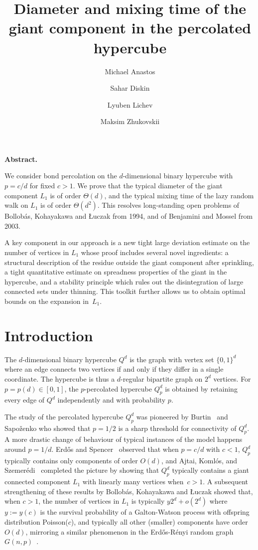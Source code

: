 \documentclass[reqno,final,a4paper]{amsart}
\title{Diameter and mixing time of the giant component in the percolated hypercube}
\author[Anastos]{Michael Anastos}
\author[Diskin]{Sahar Diskin}
\author[Lichev]{Lyuben Lichev}
\author[Zhukovskii]{Maksim Zhukovskii}
\renewenvironment{abstract}{%
  \noindent\textbf{Abstract.}%
}{}
\theoremstyle{definition}
\newcommand{\1}{\mathbbm{1}}
\begin{document}
\maketitle

\begin{abstract}
We consider bond percolation on the $d$-dimensional binary hypercube with $p=c/d$ for fixed $c>1$. 
We prove that the typical diameter of the giant component $L_1$ is of order $\Theta(d)$, and the typical mixing time of the lazy random walk on $L_1$ is of order $\Theta(d^2)$. This resolves long-standing open problems of Bollob\'as, Kohayakawa and \L{}uczak from 1994, and of Benjamini and Mossel from 2003.

A key component in our approach is a new tight large deviation estimate on the number of vertices in $L_1$ whose proof includes several novel ingredients: a structural description of the residue outside the giant component after sprinkling, a tight quantitative estimate on spreadness properties of the giant in the hypercube, and a stability principle which rules out the disintegration of large connected sets under thinning. This toolkit further allows us to obtain optimal bounds on the expansion in~$L_1$.
\end{abstract}

\section{Introduction}
The $d$-dimensional binary hypercube $Q^d$ is the graph with vertex set $\{0,1\}^d$ where an edge connects two vertices if and only if they differ in a single coordinate. The hypercube is thus a $d$-regular bipartite graph on $2^d$ vertices.
For $p=p(d)\in [0,1]$, the $p$-percolated hypercube $Q^d_p$ is obtained by retaining every edge of $Q^d$ independently and with probability $p$.

The study of the percolated hypercube $Q^d_p$ was pioneered by Burtin~\cite{B77} and Sapo\v{z}enko \cite{S67} who showed that $p=1/2$ is a sharp threshold for connectivity of $Q^d_p$. 
A more drastic change of behaviour of typical instances of the model happens around $p=1/d$.
Erd\H{o}s and Spencer~\cite{ES79} observed that when $p=c/d$ with $c<1$, $Q^d_p$ typically contains only components of order $O(d)$, and Ajtai, Koml\'os, and Szemer\'edi~\cite{AKS81} completed the picture by showing that $Q^d_p$ typically contains a giant connected component $L_1$ with linearly many vertices when~$c>1$. 
A subsequent strengthening of these results by Bollob\'as, Kohayakawa and \L{}uczak \cite{BKL92} showed that, when $c>1$, the number of vertices in $L_1$ is typically $y2^d + o(2^d)$ where $y:=y(c)$ is the survival probability of a Galton-Watson process with offspring distribution Poisson($c$), and typically all other (smaller) components have order $O(d)$, mirroring a similar phenomenon in the Erd\H{o}s-R\'enyi random graph $G(n,p)$~\cite{ER60}.
\end{document}
